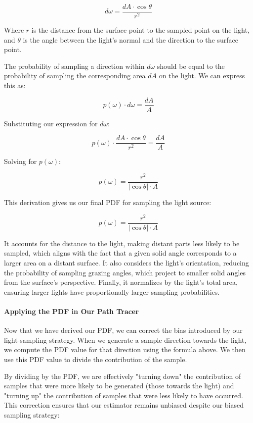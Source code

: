 \documentclass[12pt]{article}
\begin{document}
$$d\omega = \frac{dA \cdot \cos\theta}{r^2}$$

Where $r$ is the distance from the surface point to the sampled point on the light, and $\theta$ is the angle between the light's normal and the direction to the surface point.

The probability of sampling a direction within $d\omega$ should be equal to the probability of sampling the corresponding area $dA$ on the light. We can express this as:

$$p(\omega) \cdot d\omega = \frac{dA}{A}$$

Substituting our expression for $d\omega$:

$$p(\omega) \cdot \frac{dA \cdot \cos\theta}{r^2} = \frac{dA}{A}$$

Solving for $p(\omega)$:

$$p(\omega) = \frac{r^2}{|\cos\theta| \cdot A}$$


This derivation gives us our final PDF for sampling the light source:

$$p(\omega) = \frac{r^2}{|\cos\theta| \cdot A}$$

It accounts for the distance to the light, making distant parts less likely to be sampled, which aligns with the fact that a given solid angle corresponds to a larger area on a distant surface. It also considers the light's orientation, reducing the probability of sampling grazing angles, which project to smaller solid angles from the surface's perspective. Finally, it normalizes by the light's total area, ensuring larger lights have proportionally larger sampling probabilities.

\paragraph{Applying the PDF in Our Path Tracer}

Now that we have derived our PDF, we can correct the bias introduced by our light-sampling strategy. When we generate a sample direction towards the light, we compute the PDF value for that direction using the formula above. We then use this PDF value to divide the contribution of the sample.

By dividing by the PDF, we are effectively "turning down" the contribution of samples that were more likely to be generated (those towards the light) and "turning up" the contribution of samples that were less likely to have occurred. This correction ensures that our estimator remains unbiased despite our biased sampling strategy:
\end{document}
